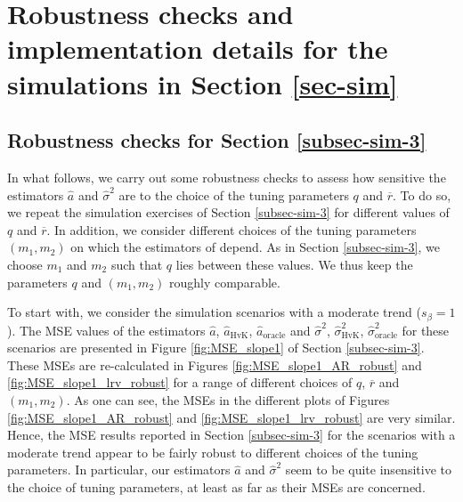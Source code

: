 
\section{Robustness checks and implementation details for the simulations in Section \ref{sec-sim}}\label{sec-supp-sim}


\subsection*{Robustness checks for Section \ref{subsec-sim-3}}


In what follows, we carry out some robustness checks to assess how sensitive the estimators $\widehat{a}$ and $\widehat{\sigma}^2$ are to the choice of the tuning parameters $q$ and $\overline{r}$. To do so, we repeat the simulation exercises of Section \ref{subsec-sim-3} for different values of $q$ and $\overline{r}$. In addition, we consider different choices of the tuning parameters $(m_1,m_2)$ on which the estimators of \cite{Hall2003} depend. As in Section \ref{subsec-sim-3}, we choose $m_1$ and $m_2$ such that $q$ lies between these values. We thus keep the parameters $q$ and $(m_1,m_2)$ roughly comparable. 


To start with, we consider the simulation scenarios with a moderate trend ($s_\beta = 1$). The MSE values of the estimators $\widehat{a}$, $\widehat{a}_{\text{HvK}}$, $\widehat{a}_{\text{oracle}}$ and $\widehat{\sigma}^2$, $\widehat{\sigma}^2_{\text{HvK}}$, $\widehat{\sigma}^2_{\text{oracle}}$ for these scenarios are presented in Figure \ref{fig:MSE_slope1} of Section \ref{subsec-sim-3}. These MSEs are re-calculated in Figures \ref{fig:MSE_slope1_AR_robust} and \ref{fig:MSE_slope1_lrv_robust} for a range of different choices of $q$, $\overline{r}$ and $(m_1,m_2)$. As one can see, the MSEs in the different plots of Figures \ref{fig:MSE_slope1_AR_robust} and \ref{fig:MSE_slope1_lrv_robust} are very similar. Hence, the MSE results reported in Section \ref{subsec-sim-3} for the scenarios with a moderate trend appear to be fairly robust to different choices of the tuning parameters. In particular, our estimators $\widehat{a}$ and $\widehat{\sigma}^2$ seem to be quite insensitive to the choice of tuning parameters, at least as far as their MSEs are concerned.


